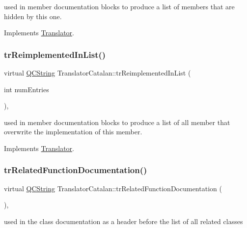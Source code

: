 used in member documentation blocks to produce a list of members that are hidden by this one. 

Implements \mbox{\hyperlink{class_translator}{Translator}}.

\mbox{\label{class_translator_catalan_a2d2fa66499e942bd184311239a481d95}} 
\subsubsection{\texorpdfstring{trReimplementedInList()}{trReimplementedInList()}}
{\footnotesize\ttfamily virtual \mbox{\hyperlink{class_q_c_string}{Q\+C\+String}} Translator\+Catalan\+::tr\+Reimplemented\+In\+List (\begin{DoxyParamCaption}\item[{int}]{num\+Entries }\end{DoxyParamCaption})\hspace{0.3cm}{\ttfamily [inline]}, {\ttfamily [virtual]}}

used in member documentation blocks to produce a list of all member that overwrite the implementation of this member. 

Implements \mbox{\hyperlink{class_translator}{Translator}}.

\mbox{\label{class_translator_catalan_ae04d53afe471433601e4d801ddd767cf}} 
\subsubsection{\texorpdfstring{trRelatedFunctionDocumentation()}{trRelatedFunctionDocumentation()}}
{\footnotesize\ttfamily virtual \mbox{\hyperlink{class_q_c_string}{Q\+C\+String}} Translator\+Catalan\+::tr\+Related\+Function\+Documentation (\begin{DoxyParamCaption}{ }\end{DoxyParamCaption})\hspace{0.3cm}{\ttfamily [inline]}, {\ttfamily [virtual]}}

used in the class documentation as a header before the list of all related classes 

